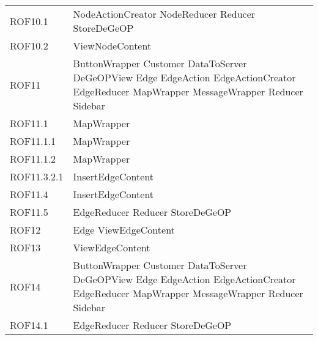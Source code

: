\begin{longtable}{p{2.5cm}!{\VRule[1pt]}p{5cm}}
	ROF10.1 & NodeActionCreator \newline NodeReducer \newline Reducer \newline StoreDeGeOP\\
	ROF10.2 & ViewNodeContent\\
	ROF11 & ButtonWrapper \newline Customer \newline DataToServer \newline DeGeOPView \newline Edge \newline EdgeAction \newline EdgeActionCreator \newline EdgeReducer \newline MapWrapper \newline MessageWrapper \newline Reducer \newline Sidebar\\
	ROF11.1 & MapWrapper\\
	ROF11.1.1 & MapWrapper\\
	ROF11.1.2 & MapWrapper\\
	ROF11.3.2.1 & InsertEdgeContent\\
	ROF11.4 & InsertEdgeContent\\
	ROF11.5 & EdgeReducer \newline Reducer \newline StoreDeGeOP\\
	ROF12 & Edge \newline ViewEdgeContent\\
	ROF13 & ViewEdgeContent\\
	ROF14 & ButtonWrapper \newline Customer \newline DataToServer \newline DeGeOPView \newline Edge \newline EdgeAction \newline EdgeActionCreator \newline EdgeReducer \newline MapWrapper \newline MessageWrapper \newline Reducer \newline Sidebar\\
	ROF14.1 & EdgeReducer \newline Reducer \newline StoreDeGeOP\\

\end{longtable}
